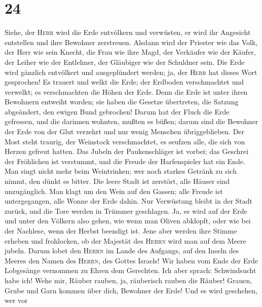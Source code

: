 \hypertarget{section-23}{%
\section{24}\label{section-23}}

 Siehe, der \textsc{Herr} wird die Erde entvölkern und
verwüsten, er wird ihr Angesicht entstellen und ihre Bewohner
zerstreuen.  Alsdann wird der Priester wie das Volk, der
Herr wie sein Knecht, die Frau wie ihre Magd, der Verkäufer wie der
Käufer, der Leiher wie der Entlehner, der Gläubiger wie der Schuldner
sein.  Die Erde wird gänzlich entvölkert und ausgeplündert
werden; ja, der \textsc{Herr} hat dieses Wort gesprochen! 
Es trauert und welkt die Erde; der Erdboden verschmachtet und verwelkt;
es verschmachten die Höhen der Erde.  Denn die Erde ist
unter ihren Bewohnern entweiht worden; sie haben die Gesetze übertreten,
die Satzung abgeändert, den ewigen Bund gebrochen!  Darum
hat der Fluch die Erde gefressen, und die darinnen wohnten, mußten es
büßen; darum sind die Bewohner der Erde von der Glut verzehrt und nur
wenig Menschen übriggeblieben.  Der Most steht traurig,
der Weinstock verschmachtet, es seufzen alle, die sich von Herzen
gefreut hatten.  Das Jubeln der Paukenschläger ist vorbei;
das Geschrei der Fröhlichen ist verstummt, und die Freude der
Harfenspieler hat ein Ende.  Man singt nicht mehr beim
Weintrinken; wer noch starkes Getränk zu sich nimmt, den dünkt es
bitter.  Die leere Stadt ist zerstört, alle Häuser sind
unzugänglich.  Man klagt um den Wein auf den Gassen; alle
Freude ist untergegangen, alle Wonne der Erde dahin.  Nur
Verwüstung bleibt in der Stadt zurück, und die Tore werden in Trümmer
geschlagen.  Ja, es wird auf der Erde und unter den
Völkern also gehen, wie wenn man Oliven abklopft, oder wie bei der
Nachlese, wenn der Herbst beendigt ist.  Jene aber werden
ihre Stimme erheben und frohlocken, ob der Majestät des \textsc{Herrn}
wird man auf dem Meere jubeln.  Darum lobet den
\textsc{Herrn} im Lande des Aufgangs, auf den Inseln des Meeres den
Namen des \textsc{Herrn}, des Gottes Israels!  Wir haben
vom Ende der Erde Lobgesänge vernommen zu Ehren dem Gerechten. Ich aber
sprach: Schwindsucht habe ich! Wehe mir, Räuber rauben, ja, räuberisch
rauben die Räuber!  Grauen, Grube und Garn kommen über
dich, Bewohner der Erde!  Und es wird geschehen, wer vor
